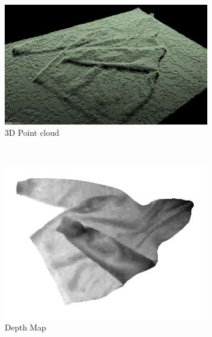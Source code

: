 \begin{figure}[htbp]
	\centering
    \begin{subfigure}[l]{0.9\textwidth}
	    \centering
    	\includegraphics[width=\textwidth]
    	{figures/point-cloud-01.png}
    	\caption{3D Point cloud}
	\end{subfigure}
	~
    \begin{subfigure}[r]{0.8\textwidth}
	    \centering
    	\includegraphics[width=\textwidth]
    	{figures/point-cloud-projection.png}
    	\caption{Depth Map}
	\end{subfigure}
    \caption{}
    \label{fig:point_cloud_and_depth_image}
\end{figure}



